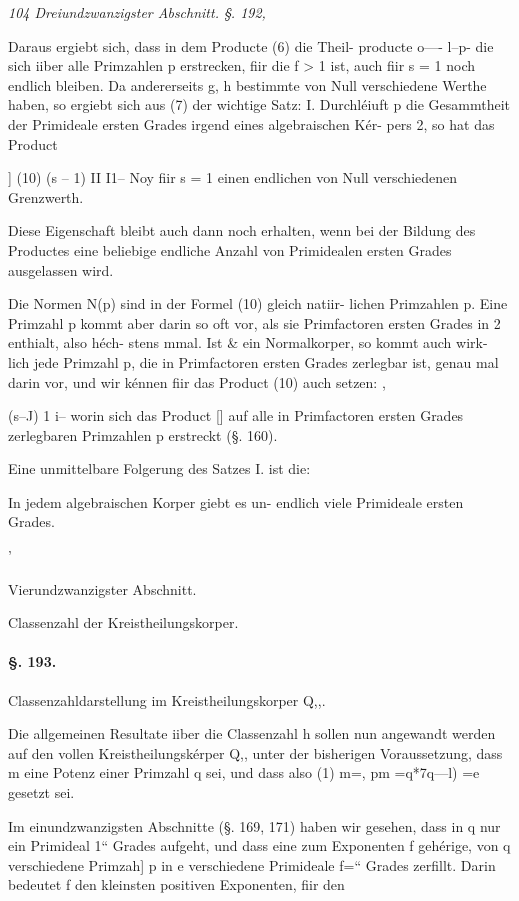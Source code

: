 \documentclass[12pt,a4paper]{article}
\theoremstyle{plain}
\theoremstyle{definition}
\begin{document}
\vspace{0.5\baselineskip}\noindent\textit{104 Dreiundzwanzigster Abschnitt. §. 192,}\par

Daraus ergiebt sich, dass in dem Producte (6) die Theil- producte o---- l--p- die sich iiber alle Primzahlen p erstrecken, fiir die f > 1 ist, auch fiir s = 1 noch endlich bleiben. Da andererseits g, h bestimmte von Null verschiedene Werthe haben, so ergiebt sich aus (7) der wichtige Satz: I. Durchléiuft p die Gesammtheit der Primideale ersten Grades irgend eines algebraischen Kér- pers 2, so hat das Product

] (10) (s -- 1) II I1-- Noy fiir s = 1 einen endlichen von Null verschiedenen Grenzwerth.

Diese Eigenschaft bleibt auch dann noch erhalten, wenn bei der Bildung des Productes eine beliebige endliche Anzahl von Primidealen ersten Grades ausgelassen wird.

Die Normen N(p) sind in der Formel (10) gleich natiir- lichen Primzahlen p. Eine Primzahl p kommt aber darin so oft vor, als sie Primfactoren ersten Grades in 2 enthialt, also héch- stens mmal. Ist \& ein Normalkorper, so kommt auch wirk- lich jede Primzahl p, die in Primfactoren ersten Grades zerlegbar ist, genau mal darin vor, und wir kénnen fiir das Product (10) auch setzen: ,

(s--J) 1 i-- worin sich das Product [] auf alle in Primfactoren ersten Grades zerlegbaren Primzahlen p erstreckt (§. 160).

Eine unmittelbare Folgerung des Satzes I. ist die:

In jedem algebraischen Korper giebt es un- endlich viele Primideale ersten Grades.

'

Vierundzwanzigster Abschnitt.

Classenzahl der Kreistheilungskorper.

\paragraph{§. 193.}

Classenzahldarstellung im Kreistheilungskorper Q,,.

Die allgemeinen Resultate iiber die Classenzahl h sollen nun angewandt werden auf den vollen Kreistheilungskérper Q,, unter der bisherigen Voraussetzung, dass m eine Potenz einer Primzahl q sei, und dass also (1) m=, pm =q*7q---l) =e gesetzt sei.

Im einundzwanzigsten Abschnitte (§. 169, 171) haben wir gesehen, dass in q nur ein Primideal 1`` Grades aufgeht, und dass eine zum Exponenten f gehérige, von q verschiedene Primzah] p in e verschiedene Primideale f=`` Grades zerfillt. Darin bedeutet f den kleinsten positiven Exponenten, fiir den
\end{document}
